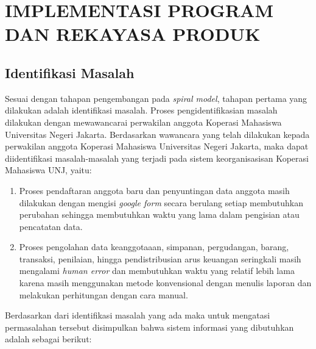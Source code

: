
\chapter{IMPLEMENTASI PROGRAM DAN REKAYASA PRODUK}

\section{Identifikasi Masalah}
Sesuai dengan tahapan pengembangan pada \textit{spiral model}, tahapan pertama yang dilakukan adalah identifikasi masalah. Proses pengidentifikasian masalah dilakukan dengan mewawancarai perwakilan anggota Koperasi Mahasiswa Universitas Negeri Jakarta. Berdasarkan wawancara yang telah dilakukan kepada perwakilan anggota Koperasi Mahasiswa Universitas Negeri Jakarta, maka dapat diidentifikasi masalah-masalah yang terjadi pada sistem keorganisasisan Koperasi Mahasiswa UNJ, yaitu:

\begin{enumerate}
	\item Proses pendaftaran anggota baru dan penyuntingan data anggota masih dilakukan dengan mengisi \emph{google form} secara berulang setiap membutuhkan perubahan sehingga membutuhkan waktu yang lama dalam pengisian atau pencatatan data.
	\item Proses pengolahan data keanggotaaan, simpanan, pergudangan, barang, transaksi, penilaian, hingga pendistribusian arus keuangan seringkali masih mengalami \emph{human error} dan membutuhkan waktu yang relatif lebih lama karena masih menggunakan metode konvensional dengan menulis laporan dan melakukan perhitungan dengan cara manual.
\end{enumerate}

Berdasarkan dari identifikasi masalah yang ada maka untuk mengatasi permasalahan tersebut disimpulkan bahwa sistem informasi yang dibutuhkan adalah sebagai berikut:

